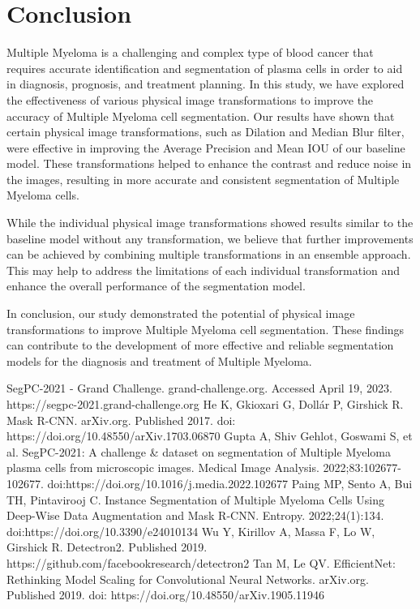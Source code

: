 \documentclass{article}
\begin{document}
\section{Conclusion}

Multiple Myeloma is a challenging and complex type of blood cancer that requires accurate identification and segmentation of plasma cells in order to aid in diagnosis, prognosis, and treatment planning. In this study, we have explored the effectiveness of various physical image transformations to improve the accuracy of Multiple Myeloma cell segmentation. Our results have shown that certain physical image transformations, such as Dilation and Median Blur filter, were effective in improving the Average Precision and Mean IOU of our baseline model. These transformations helped to enhance the contrast and reduce noise in the images, resulting in more accurate and consistent segmentation of Multiple Myeloma cells.

While the individual physical image transformations showed results similar to the baseline model without any transformation, we believe that further improvements can be achieved by combining multiple transformations in an ensemble approach. This may help to address the limitations of each individual transformation and enhance the overall performance of the segmentation model.

In conclusion, our study demonstrated the potential of physical image transformations to improve Multiple Myeloma cell segmentation. These findings can contribute to the development of more effective and reliable segmentation models for the diagnosis and treatment of Multiple Myeloma.

\begin{thebibliography}{99}

  \bibitem{} SegPC-2021 - Grand Challenge. grand-challenge.org. Accessed April 19, 2023. https://segpc-2021.grand-challenge.org
  \bibitem{} He K, Gkioxari G, Dollár P, Girshick R. Mask R-CNN. arXiv.org. Published 2017. doi: https://doi.org/10.48550/arXiv.1703.06870
  \bibitem{} Gupta A, Shiv Gehlot, Goswami S, et al. SegPC-2021: A challenge \& dataset on segmentation of Multiple Myeloma plasma cells from microscopic images. Medical Image Analysis. 2022;83:102677-102677. doi:https://doi.org/10.1016/j.media.2022.102677
  \bibitem{} Paing MP, Sento A, Bui TH, Pintavirooj C. Instance Segmentation of Multiple Myeloma Cells Using Deep-Wise Data Augmentation and Mask R-CNN. Entropy. 2022;24(1):134. doi:https://doi.org/10.3390/e24010134
  \bibitem{} Wu Y, Kirillov A, Massa F, Lo W, Girshick R. Detectron2. Published 2019. https://github.com/facebookresearch/detectron2
  \bibitem{} Tan M, Le QV. EfficientNet: Rethinking Model Scaling for Convolutional Neural Networks. arXiv.org. Published 2019. doi: https://doi.org/10.48550/arXiv.1905.11946
  
\end{thebibliography}
\end{document}
